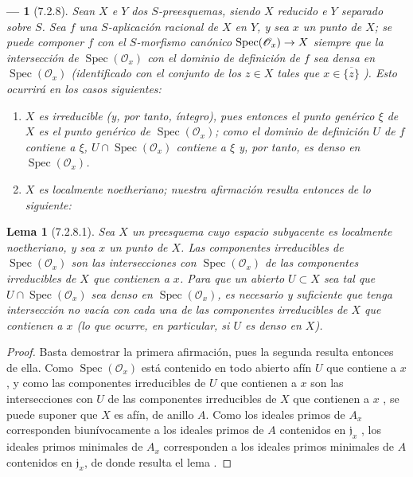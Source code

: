 \documentclass[oneside]{amsart}
\theoremstyle{ega-env-style}
\newtheorem*{env}{---}
\theoremstyle{ega-thm-env-style}
\newtheorem*{lemma}{Lema}
\theoremstyle{ega-defn-env-style}
\renewcommand{\to}{\mathchoice{\longrightarrow}{\rightarrow}{\rightarrow}{\rightarrow}}
\newcommand{\oldpage}[2][]{{\marginnote{\normalfont{\textbf{#1}~|~#2}}}\ignorespaces}
\let\EGAOriginalLabel\label
\renewcommand{\label}[1]{\phantomsection\EGAOriginalLabel{#1}}
\begin{document}
\begin{env}[7.2.8]
\label{I.7.2.8}
Sean $X$ e $Y$ dos $S$-preesquemas, siendo $X$ reducido e $Y$ separado sobre $S$.
Sea $f$ una $S$-aplicación racional de $X$ en $Y$, y sea $x$ un punto de $X$; se puede componer $f$ con el $S$-morfismo canónico $\operatorname{Spec}(\mathscr{O}_x)\to X$  siempre que la intersección de $\operatorname{Spec}(\mathscr{O}_x)$ con el dominio de definición de $f$ sea densa en $\operatorname{Spec}(\mathscr{O}_x)$ (identificado con el conjunto de los $z\in X$ tales que $x\in\overline{\{z\}}$ ).
Esto ocurrirá en los casos siguientes:
\begin{enumerate}
  \item[1.º] $X$ es \emph{irreducible} (y, por tanto, \emph{íntegro}), pues entonces el punto genérico $\xi$ de $X$ es el punto genérico de $\operatorname{Spec}(\mathscr{O}_x)$; como el dominio de definición $U$ de $f$ contiene a $\xi$, $U\cap\operatorname{Spec}(\mathscr{O}_x)$ contiene a $\xi$ y, por tanto, es denso en $\operatorname{Spec}(\mathscr{O}_x)$.
  \item[2.º] $X$ es \emph{localmente noetheriano}; nuestra afirmación resulta entonces de lo siguiente:
\end{enumerate}
\end{env}

\begin{lemma}[7.2.8.1]
\label{I.7.2.8.1}
Sea $X$ un preesquema cuyo espacio subyacente es localmente noetheriano, y sea $x$ un punto de $X$.
Las componentes irreducibles de $\operatorname{Spec}(\mathscr{O}_x)$ son las intersecciones con $\operatorname{Spec}(\mathscr{O}_x)$ de las componentes irreducibles de $X$ que contienen a $x$.
Para que un abierto $U\subset X$ sea tal que $U\cap\operatorname{Spec}(\mathscr{O}_x)$ sea denso en $\operatorname{Spec}(\mathscr{O}_x)$, es necesario y suficiente que tenga intersección no vacía con cada una de las componentes irreducibles de $X$ que contienen a $x$ \textup{(lo que ocurre, en particular, si $U$ es \emph{denso} en $X$)}.
\end{lemma}

\begin{proof}
Basta demostrar la primera afirmación, pues la segunda resulta entonces de ella.
Como $\operatorname{Spec}(\mathscr{O}_x)$ está contenido en todo abierto afín $U$ que contiene a $x$, y como las componentes irreducibles de $U$ que contienen a $x$ son las intersecciones con $U$ de las componentes irreducibles de $X$ que contienen a $x$ , se puede suponer que $X$ es afín, de anillo $A$.
Como los ideales primos de $A_x$ corresponden biunívocamente a los ideales primos
\oldpage[I]{161}
de $A$ contenidos en $\mathfrak{j}_x$ , los ideales primos minimales de $A_x$ corresponden a los ideales primos minimales de $A$ contenidos en $\mathfrak{j}_x$, de donde resulta el lema .
\end{proof}
\end{document}
